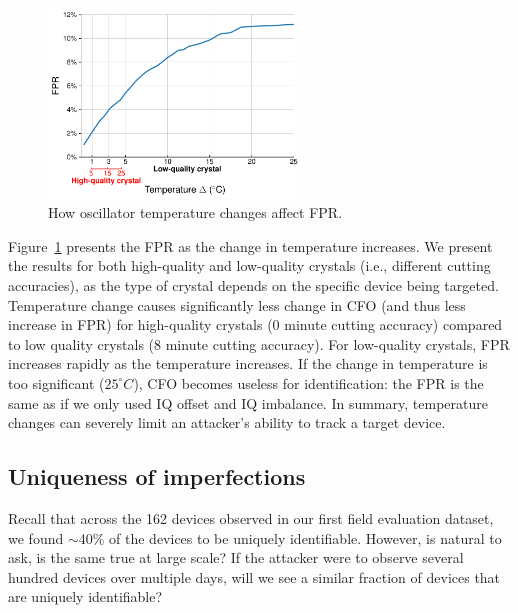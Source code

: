 \begin{figure}[!h]
    \centering
    \captionsetup{justification=centering}
    \includegraphics[width = 0.6\textwidth]{bletracking/plots/fpr_temp_thresh_new.pdf} 
    \caption{How oscillator temperature changes affect FPR.}
    \label{fig:fpr_temp}
\end{figure}


Figure~\ref{fig:fpr_temp} presents the FPR as the change in temperature increases. We
present the results for both high-quality and low-quality crystals (i.e.,
different cutting accuracies), as the type of crystal depends on the specific
device being targeted. Temperature change causes significantly less change in
CFO (and thus less increase in FPR) for high-quality crystals (0 minute cutting
accuracy) compared to low quality crystals (8 minute cutting accuracy). For
low-quality crystals, FPR increases rapidly as the temperature increases.  If
the change in temperature is too significant ($25^\circ C$), CFO 
becomes useless for identification: the FPR is the same as if we only used IQ offset
and IQ imbalance. In summary, temperature changes can severely limit an attacker's ability to track a target device.


\subsection{Uniqueness of imperfections}

Recall that across the 162 devices observed in our first field evaluation dataset,
we found $\sim$40\% of the devices to be uniquely identifiable. %
However, is natural to ask, is the same 
true at large scale? If the attacker were to observe several hundred devices
over multiple days, will we see a similar fraction of devices that are
uniquely identifiable?

